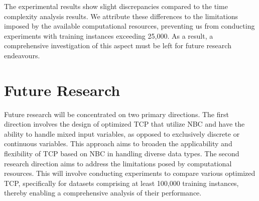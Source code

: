 \documentclass[10pt]{reportMaster}
\begin{document}
\noindent The experimental results show slight discrepancies compared to the time complexity analysis results. We attribute these differences to the limitations imposed by the available computational resources, preventing us from conducting experiments with training instances exceeding 25,000. As a result, a comprehensive investigation of this aspect must be left for future research endeavours.

\section{Future Research}
Future research will be concentrated on two primary directions. The first direction involves the design of optimized TCP that utilize NBC and have the ability to handle mixed input variables, as opposed to exclusively discrete or continuous variables. This approach aims to broaden the applicability and flexibility of TCP based on NBC in handling diverse data types. The second research direction aims to address the limitations posed by computational resources. This will involve conducting experiments to compare various optimized TCP, specifically for datasets comprising at least 100,000 training instances, thereby enabling a comprehensive analysis of their performance.



\end{document}
